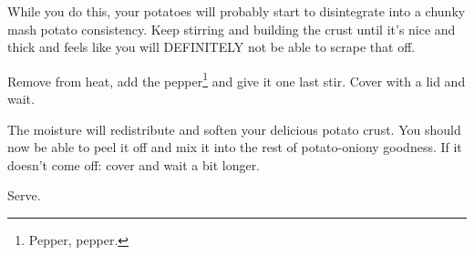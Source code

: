\begin{recipe}
{        While you do this, your potatoes will probably start to disintegrate into a chunky mash potato consistency. Keep stirring and building the crust until it’s nice and thick and feels like you will DEFINITELY not be able to scrape that off.

        \step Remove from heat, add the pepper\footnote{Pepper, pepper.} and give it one last stir. Cover with a lid and wait.

        \vspace{15em}

        \step The moisture will redistribute and soften your delicious potato crust. You should now be able to peel it off and mix it into the rest of potato-oniony goodness. If it doesn’t come off: cover and wait a bit longer.

        \step Serve.
    }

\end{recipe}